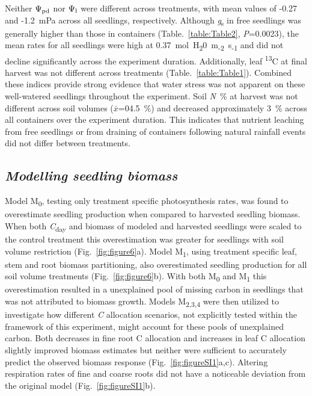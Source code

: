 \documentclass[a4paper]{article}\usepackage[]{graphicx}\usepackage[]{color}
\begin{document}
Neither $\Psi\textsubscript{pd}$ nor $\Psi\textsubscript{l}$ were different across treatments, with mean values of -0.27 and -1.2~mPa across all seedlings, respectively. Although \textit{g}\textsubscript{s} in free seedlings was generally higher than those in containers (Table.~\ref{table:Table2}, \textit{P}=0.0023), the mean rates for all seedlings were high at 0.37~mol~H\textsubscript{2}0~m\textsubscript{-2}~s\textsubscript{-1} and did not decline significantly across the experiment duration. Additionally, leaf {\textdelta}\textsuperscript{13}C at final harvest was not different across treatments (Table.~\ref{table:Table1}). Combined these indices provide strong evidence that water stress was not apparent on these well-watered seedlings throughout the experiment. Soil \textit{N}~\% at harvest was not different across soil volumes ($\bar{x}$=04.5~\%) and decreased approximately 3~\% across all containers over the experiment duration. This indicates that nutrient leaching from free seedlings or from draining of containers following natural rainfall events did not differ between treatments. 

\subsection*{\textit{Modelling seedling biomass}}
Model M\textsubscript{0}, testing only treatment specific photosynthesis rates, was found to overestimate seedling production when compared to harvested seedling biomass. When both \textit{C}\textsubscript{day} and biomass of modeled and harvested seedlings were scaled to the control treatment this overestimation was greater for seedlings with soil volume restriction (Fig.~\ref{fig:figure6}a). Model M\textsubscript{1}, using treatment specific leaf, stem and root biomass partitioning, also overestimated seedling production for all soil volume treatments (Fig.~\ref{fig:figure6}b). With both  M\textsubscript{0} and  M\textsubscript{1} this overestimation resulted in a unexplained pool of missing carbon in seedlings that was not attributed to biomass growth. Models M\textsubscript{2,3,4} were then utilized to investigate how different \textit{C} allocation scenarios, not explicitly tested within the framework of this experiment, might account for these pools of unexplained carbon. Both decreases in fine root C allocation and increases in leaf C allocation slightly improved biomass estimates but neither were sufficient to accurately predict the observed biomass response  (Fig.~\ref{fig:figureSI1}a,c). Altering respiration rates of fine and coarse roots did not have a noticeable deviation from the original model (Fig.~\ref{fig:figureSI1}b).
\end{document}
